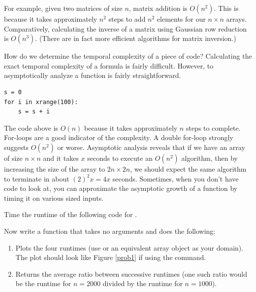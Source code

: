 For example, given two matrices of size $n$, matrix addition is $O(n^2)$. This is because it takes approximately $n^2$ steps to add $n^2$ elements for our $n \times n$ arrays. 
Comparatively, calculating the inverse of a matrix using Gaussian
row reduction is $O(n^3)$. (There are in fact more efficient
algorithms for matrix inversion.)

How do we determine the temporal complexity of a piece of code?
Calculating the exact temporal complexity of a formula is fairly difficult.
However, to asymptotically analyze a function is fairly straightforward.

\begin{lstlisting}
s = 0
for i in xrange(100):
    s = s + i
\end{lstlisting}

The code above is $O(n)$ because it takes approximately $n$ steps to complete. For-loops are a good indicator of the complexity.  A double for-loop strongly suggests $O(n^2)$ or worse.  Asymptotic analysis reveals that
if we have an array of size $n \times n$ and it takes $x$ seconds to execute an $O(n^2)$ algorithm,
then by increasing the size of the array to $2n \times 2n$, we should expect the same algorithm
to terminate in about $(2)^2 x = 4x$ seconds.  Sometimes, when you don't have code to look at,
you can approximate the asymptotic growth of a function by timing it on various sized inputs.

\begin{problem}
Time the runtime of the following code for .



Now write a function that takes no arguments and does the following: 
\begin{enumerate}
\item Plots the four runtimes (use \li{[1000, 2000, 4000, 8000]} or an equivalent array object as your domain).
The plot should look like Figure \ref{prob1} if using the  command. 
\item Returns the average ratio between successive runtimes (one such ratio would be the runtime for $n = 2000$ divided by the runtime for $n = 1000$).
\end{enumerate}
\end{problem}


